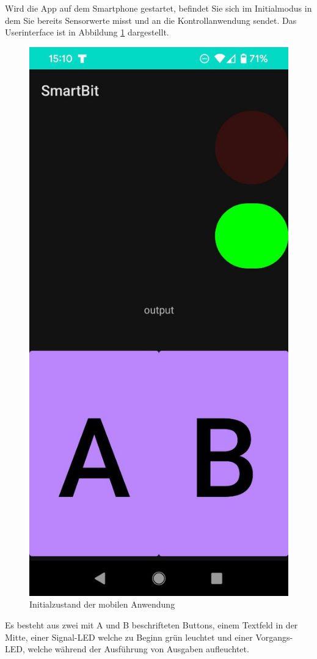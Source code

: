 \documentclass[11pt,a4paper]{report}
\begin{document}
Wird die App auf dem Smartphone gestartet, befindet Sie sich im Initialmodus in dem Sie bereits Sensorwerte misst und an die Kontrollanwendung sendet.
Das Userinterface ist in Abbildung \ref{fig:initial_app} dargestellt.
\begin{figure}[htbp]
  \centering
  \includegraphics[height=0.4\textheight]{images/app_initial}
  \caption{Initialzustand der mobilen Anwendung}
  \label{fig:initial_app}
\end{figure}
Es besteht aus zwei mit A und B beschrifteten Buttons, einem Textfeld in der Mitte, einer Signal-LED welche zu Beginn grün leuchtet und einer Vorgangs-LED, welche während der Ausführung von Ausgaben aufleuchtet.
\end{document}
